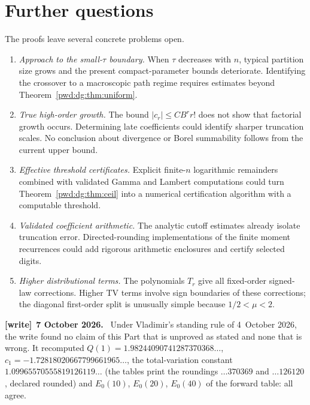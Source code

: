 \documentclass[11pt,letterpaper]{article}
\numberwithin{equation}{section}
\theoremstyle{remark}\newtheorem{remark}[theorem]{Remark}
\newenvironment{writenote}[1][]{\par\smallskip\begingroup\small
 \noindent\textbf{[write]}\if\relax\detokenize{#1}\relax\else~\textbf{#1.}\fi\ }%
 {\par\endgroup\smallskip}
\begin{document}
\section{Further questions}\label{pwd:dg:sec:questions}
The proofs leave several concrete problems open.
\begin{enumerate}
\item \emph{Approach to the small-$\tau$ boundary.} When $\tau$ decreases with $n$, typical partition size grows and the present compact-parameter bounds deteriorate. Identifying the crossover to a macroscopic path regime requires estimates beyond Theorem~\ref{pwd:dg:thm:uniform}.
\item \emph{True high-order growth.} The bound $|c_r|\le CB^rr!$ does not show that factorial growth occurs. Determining late coefficients could identify sharper truncation scales. No conclusion about divergence or Borel summability follows from the current upper bound.
\item \emph{Effective threshold certificates.} Explicit finite-$n$ logarithmic remainders combined with validated Gamma and Lambert computations could turn Theorem~\ref{pwd:dg:thm:ceil} into a numerical certification algorithm with a computable threshold.
\item \emph{Validated coefficient arithmetic.} The analytic cutoff estimates already isolate truncation error. Directed-rounding implementations of the finite moment recurrences could add rigorous arithmetic enclosures and certify selected digits.
\item \emph{Higher distributional terms.} The polynomials $T_r$ give all fixed-order signed-law corrections. Higher TV terms involve sign boundaries of these corrections; the diagonal first-order split is unusually simple because $1/2<\mu<2$.
\end{enumerate}
\begin{writenote}[7 October 2026]
Under Vladimir's standing rule of 4~October 2026, the write found no claim of
this Part that is unproved as stated and none that is wrong. It recomputed
$Q(1)=1.98244090741287370368\ldots$, $c_1=-1.72818020667799661965\ldots$,
the total-variation constant $1.09965570555819126119\ldots$ (the tables print
the roundings $\ldots370369$ and $\ldots126120$, declared rounded) and
$E_0(10)$, $E_0(20)$, $E_0(40)$ of the forward table: all agree.
\end{writenote}
\end{document}
